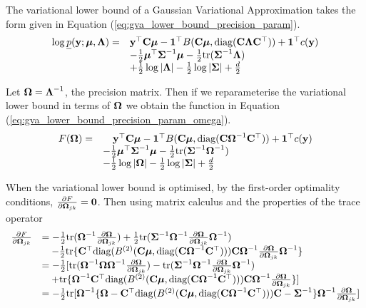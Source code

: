 The variational lower bound of a Gaussian Variational Approximation takes the form given in Equation
(\ref{eq:gva_lower_bound_precision_param}).
\begin{equation}
\label{eq:gva_lower_bound_precision_param}
\begin{array}{ll}
\log \underline{p}({\bf y}; {\boldsymbol \mu}, {\boldsymbol \Lambda}) =& {\bf y}^\top {\bf C} {\boldsymbol\mu} - {\bf 1}^\top B({\bf C} {\boldsymbol \mu}, \text{diag}({\bf C} {\boldsymbol \Lambda} {\bf C}^\top)) + {\bf 1}^\top c({\bf y}) \\
&- \tfrac{1}{2} {\boldsymbol \mu}^\top {\boldsymbol\Sigma}^{-1} {\boldsymbol \mu} - \tfrac{1}{2} \text{tr}({\boldsymbol \Sigma}^{-1} {\boldsymbol \Lambda}) \\
&+ \tfrac{1}{2} \log |{\boldsymbol \Lambda}| - \tfrac{1}{2} \log |{\boldsymbol \Sigma}| + \tfrac{d}{2}
\end{array}
\end{equation}

Let ${\boldsymbol \Omega} = {\boldsymbol \Lambda}^{-1}$, the precision matrix. Then if we reparameterise the variational lower bound in
terms of ${\boldsymbol \Omega}$ we obtain the function in Equation (\ref{eq:gva_lower_bound_precision_param_omega}).
\begin{equation}
\label{eq:gva_lower_bound_precision_param_omega}
\begin{array}{ll}
F({\boldsymbol \Omega}) =& \quad {\bf y}^\top {\bf C} {\boldsymbol\mu} - {\bf 1}^\top B({\bf C} {\boldsymbol \mu}, \text{diag}({\bf C} {\boldsymbol \Omega}^{-1} {\bf C}^\top)) + {\bf 1}^\top c({\bf y}) \\
&- \tfrac{1}{2} {\boldsymbol \mu}^\top {\boldsymbol\Sigma}^{-1} {\boldsymbol \mu} - \tfrac{1}{2} \text{tr}({\boldsymbol \Sigma}^{-1} {\boldsymbol \Omega}^{-1}) \\
&- \tfrac{1}{2} \log |{\boldsymbol \Omega}| - \tfrac{1}{2} \log |{\boldsymbol \Sigma}| + \tfrac{d}{2}
\end{array}
\end{equation}

When the variational lower bound is optimised, by the first-order optimality conditions, $\tfrac{\partial
F}{\partial {\boldsymbol\Omega}_{jk}} = {\bf 0}$. Then using matrix calculus and the properties of the trace operator
\begin{equation*}
\begin{array}{ll}
\tfrac{\partial F}{\partial {\boldsymbol\Omega}_{jk}} &= -\tfrac{1}{2} \text{tr}({\boldsymbol \Omega}^{-1} \tfrac{\partial {\boldsymbol\Omega}}{\partial {\boldsymbol\Omega}_{jk}}) + \tfrac{1}{2} \text{tr}({\boldsymbol \Sigma}^{-1} {\boldsymbol \Omega}^{-1} \tfrac{\partial {\boldsymbol\Omega}}{\partial {\boldsymbol\Omega}_{jk}} {\boldsymbol \Omega}^{-1}) \\
&\quad -\tfrac{1}{2} \text{tr}\{{\bf C}^\top \text{diag}(B^{(2)}({\bf C} {\boldsymbol \mu}, \text{diag}({\bf C} {\boldsymbol \Omega}^{-1} {\bf C}^\top))) {\bf C} {\boldsymbol \Omega}^{-1} \tfrac{\partial {\boldsymbol\Omega}}{\partial {\boldsymbol\Omega}_{jk}} {\boldsymbol \Omega}^{-1}\} \\
&=-\tfrac{1}{2} [ \text{tr}({\boldsymbol \Omega}^{-1} {\boldsymbol \Omega} {\boldsymbol \Omega}^{-1} \tfrac{\partial {\boldsymbol\Omega}}{\partial {\boldsymbol\Omega}_{jk}}) - \text{tr}({\boldsymbol \Sigma}^{-1} {\boldsymbol \Omega}^{-1} \tfrac{\partial {\boldsymbol\Omega}}{\partial {\boldsymbol\Omega}_{jk}} {\boldsymbol \Omega}^{-1}) \\
&\quad + \text{tr}\{{\boldsymbol \Omega}^{-1} {\bf C}^\top \text{diag}(B^{(2)}({\bf C} {\boldsymbol \mu}, \text{diag}({\bf C} {\boldsymbol \Omega}^{-1} {\bf C}^\top))) {\bf C} {\boldsymbol \Omega}^{-1} \tfrac{\partial {\boldsymbol\Omega}}{\partial {\boldsymbol\Omega}_{jk}}\} ] \\
&= -\tfrac{1}{2} \text{tr}[{\boldsymbol \Omega}^{-1}\{ {\boldsymbol \Omega} - {\bf C}^\top \text{diag}(B^{(2)}({\bf C} {\boldsymbol \mu}, \text{diag}({\bf C} {\boldsymbol \Omega}^{-1} {\bf C}^\top))) {\bf C} - {\boldsymbol \Sigma}^{-1} \} {\boldsymbol \Omega}^{-1} \tfrac{\partial {\boldsymbol\Omega}}{\partial {\boldsymbol\Omega}_{jk}}]
\end{array}
\end{equation*}


